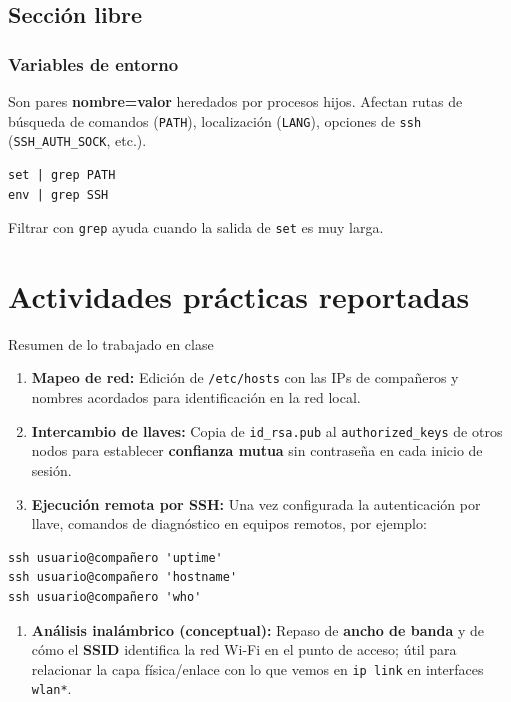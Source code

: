 \documentclass[11pt, letterpaper]{article}
\begin{document}
\subsection{Sección libre}
\label{sec:org99087b3}

\subsubsection{Variables de entorno}
\label{sec:org1e17464}
Son pares \textbf{nombre=valor} heredados por procesos hijos. Afectan rutas de búsqueda de comandos (\texttt{PATH}), localización (\texttt{LANG}), opciones de \texttt{ssh} (\texttt{SSH\_AUTH\_SOCK}, etc.).

\begin{verbatim}
set | grep PATH
env | grep SSH
\end{verbatim}

Filtrar con \texttt{grep} ayuda cuando la salida de \texttt{set} es muy larga.
\section{Actividades prácticas reportadas}
\label{sec:org1d61359}

Resumen de lo trabajado en clase

\begin{enumerate}
\item \textbf{Mapeo de red:} Edición de \texttt{/etc/hosts} con las IPs de compañeros y nombres acordados para identificación en la red local.
\item \textbf{Intercambio de llaves:} Copia de \texttt{id\_rsa.pub} al \texttt{authorized\_keys} de otros nodos para establecer \textbf{confianza mutua} sin contraseña en cada inicio de sesión.
\item \textbf{Ejecución remota por SSH:} Una vez configurada la autenticación por llave, comandos de diagnóstico en equipos remotos, por ejemplo:
\end{enumerate}

\begin{verbatim}
ssh usuario@compañero 'uptime'
ssh usuario@compañero 'hostname'
ssh usuario@compañero 'who'
\end{verbatim}

\begin{enumerate}
\item \textbf{Análisis inalámbrico (conceptual):} Repaso de \textbf{ancho de banda} y de cómo el \textbf{SSID} identifica la red Wi-Fi en el punto de acceso; útil para relacionar la capa física/enlace con lo que vemos en \texttt{ip link} en interfaces \texttt{wlan*}.
\end{enumerate}
\end{document}
